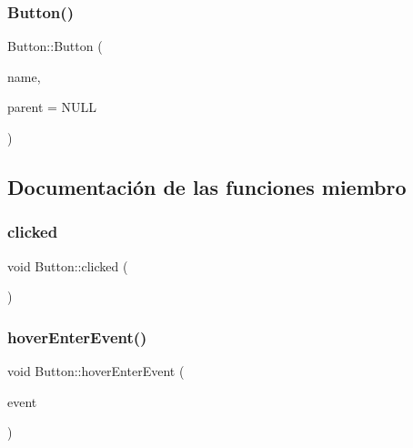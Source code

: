 \subsubsection{\texorpdfstring{Button()}{Button()}}
{\footnotesize\ttfamily Button\+::\+Button (\begin{DoxyParamCaption}\item[{Q\+String}]{name,  }\item[{Q\+Graphics\+Item $\ast$}]{parent = {\ttfamily NULL} }\end{DoxyParamCaption})}



\subsection{Documentación de las funciones miembro}
\hypertarget{class_button_a9e7ab4152cb1e7e3beb7f2842f32670c}{}\label{class_button_a9e7ab4152cb1e7e3beb7f2842f32670c} 
\subsubsection{\texorpdfstring{clicked}{clicked}}
{\footnotesize\ttfamily void Button\+::clicked (\begin{DoxyParamCaption}{ }\end{DoxyParamCaption})\hspace{0.3cm}{\ttfamily [signal]}}

\hypertarget{class_button_a633a9684818bc5d300a622a00064f09c}{}\label{class_button_a633a9684818bc5d300a622a00064f09c} 
\subsubsection{\texorpdfstring{hover\+Enter\+Event()}{hoverEnterEvent()}}
{\footnotesize\ttfamily void Button\+::hover\+Enter\+Event (\begin{DoxyParamCaption}\item[{Q\+Graphics\+Scene\+Hover\+Event $\ast$}]{event }\end{DoxyParamCaption})}

\hypertarget{class_button_a1689a97690d9469ce8350d24db0d7485}{}\label{class_button_a1689a97690d9469ce8350d24db0d7485} 
